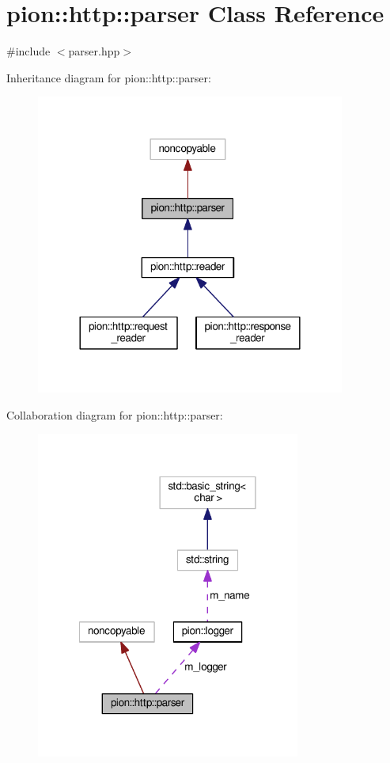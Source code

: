 \hypertarget{classpion_1_1http_1_1parser}{\section{pion\-:\-:http\-:\-:parser Class Reference}
\label{classpion_1_1http_1_1parser}
}


{\ttfamily \#include $<$parser.\-hpp$>$}



Inheritance diagram for pion\-:\-:http\-:\-:parser\-:
\nopagebreak
\begin{figure}[H]
\begin{center}
\leavevmode
\includegraphics[width=288pt]{classpion_1_1http_1_1parser__inherit__graph}
\end{center}
\end{figure}


Collaboration diagram for pion\-:\-:http\-:\-:parser\-:
\nopagebreak
\begin{figure}[H]
\begin{center}
\leavevmode
\includegraphics[width=246pt]{classpion_1_1http_1_1parser__coll__graph}
\end{center}
\end{figure}
